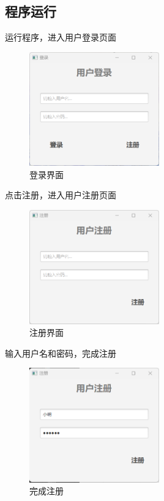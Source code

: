 \documentclass[utf8]{article}
\begin{document}
\subsection{程序运行}
运行程序，进入用户登录页面
\begin{figure}[H]
    \centering
    \includegraphics[width=0.5\textwidth]{pictures/5}
    \caption{登录界面}
\end{figure}
点击注册，进入用户注册页面
\begin{figure}[H]
    \centering
    \includegraphics[width=0.5\textwidth]{pictures/6}
    \caption{注册界面}
\end{figure}
输入用户名和密码，完成注册
\begin{figure}[H]
    \centering
    \includegraphics[width=0.5\textwidth]{pictures/12}
    \caption{完成注册}
\end{figure}
\end{document}
